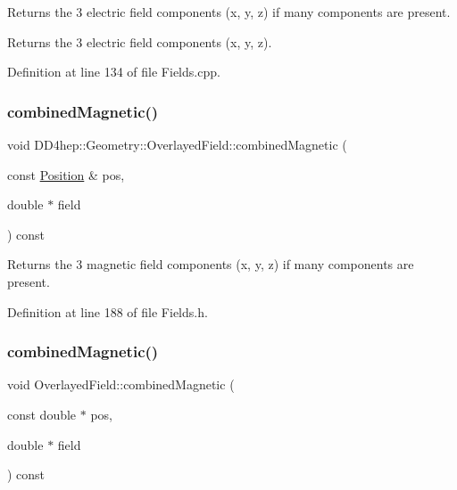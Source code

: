 Returns the 3 electric field components (x, y, z) if many components are present. 

Returns the 3 electric field components (x, y, z). 

Definition at line 134 of file Fields.\+cpp.

\hypertarget{class_d_d4hep_1_1_geometry_1_1_overlayed_field_ab3001a0930c5aa5e996135db201971af}{}\label{class_d_d4hep_1_1_geometry_1_1_overlayed_field_ab3001a0930c5aa5e996135db201971af} 
\subsubsection{\texorpdfstring{combined\+Magnetic()}{combinedMagnetic()}\hspace{0.1cm}{\footnotesize\ttfamily [1/2]}}
{\footnotesize\ttfamily void D\+D4hep\+::\+Geometry\+::\+Overlayed\+Field\+::combined\+Magnetic (\begin{DoxyParamCaption}\item[{const \hyperlink{namespace_d_d4hep_1_1_geometry_a55083902099d03506c6db01b80404900}{Position} \&}]{pos,  }\item[{double $\ast$}]{field }\end{DoxyParamCaption}) const\hspace{0.3cm}{\ttfamily [inline]}}



Returns the 3 magnetic field components (x, y, z) if many components are present. 



Definition at line 188 of file Fields.\+h.

\hypertarget{class_d_d4hep_1_1_geometry_1_1_overlayed_field_a803c1f4b73841b6ec1399b5896fb0fb1}{}\label{class_d_d4hep_1_1_geometry_1_1_overlayed_field_a803c1f4b73841b6ec1399b5896fb0fb1} 
\subsubsection{\texorpdfstring{combined\+Magnetic()}{combinedMagnetic()}\hspace{0.1cm}{\footnotesize\ttfamily [2/2]}}
{\footnotesize\ttfamily void Overlayed\+Field\+::combined\+Magnetic (\begin{DoxyParamCaption}\item[{const double $\ast$}]{pos,  }\item[{double $\ast$}]{field }\end{DoxyParamCaption}) const}



